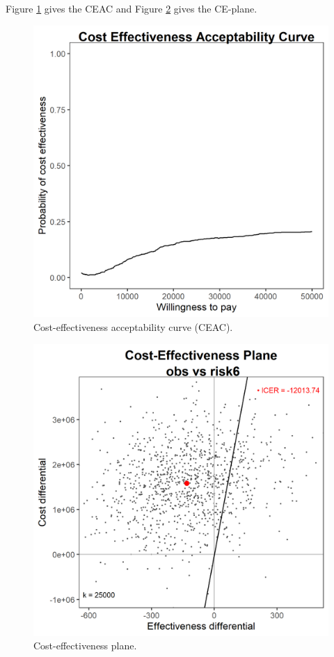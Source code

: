 \documentclass[
]{article}
\begin{document}
Figure \ref{fig:ceac} gives the CEAC and
Figure \ref{fig:ceplane} gives the CE-plane.

\begin{figure}

{\centering \includegraphics[width=19.22in]{../../images/ceac} 

}

\caption{Cost-effectiveness acceptability curve (CEAC).}\label{fig:ceac}
\end{figure}

\begin{figure}

{\centering \includegraphics[width=19.22in]{../../images/ceplane} 

}

\caption{Cost-effectiveness plane.}\label{fig:ceplane}
\end{figure}
\end{document}
